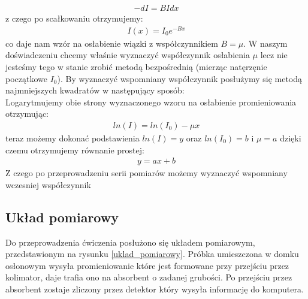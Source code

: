 \documentclass[a4paper]{article}
\begin{document}
\begin{align*}
−dI = B I dx
\end{align*}
z czego po scałkowaniu otrzymujemy:
\begin{align*}
I ( x)=I_0 e^{−B x}
\end{align*}
co daje nam wzór na osłabienie wiązki z współczynnikiem $B = \mu$.
W naszym doświadczeniu chcemy właśnie wyznaczyć współczynnik osłabienia $\mu$ lecz nie jesteśmy tego w stanie zrobić metodą bezpośrednią (mierząc natęrzęnie początkowe $I_0$). By wyznaczyć wspomniany współczynnik posłużymy się metodą najmniejszych kwadratów w następujący sposób:\\
Logarytmujemy obie strony wyznaczonego wzoru na osłabienie promieniowania otrzymując:
\begin{align*}
ln( I )=ln( I_0 )−\mu x
\end{align*}
teraz możemy dokonać podstawienia $ln(I) = y$ oraz $ln (I_0 ) =b$ i $\mu = a$ dzięki czemu otrzymujemy równanie prostej:
\begin{align*}
y = ax + b
\end{align*}
Z czego po przeprowadzeniu serii pomiarów możemy wyznaczyć wspomniany wczesniej współczynnik



\subsection{Układ pomiarowy} %
Do przeprowadzenia ćwiczenia posłużono się układem pomiarowym,
przedstawionym na rysunku \ref{uklad_pomiarowy}. Próbka umieszczona w domku osłonowym wysyła promieniowanie które jest formowane przy przejściu przez kolimator, daje trafia ono na absorbent o zadanej grubości. Po przejściu przez absorbent zostaje zliczony przez detektor który wysyła informację do komputera.
\end{document}
